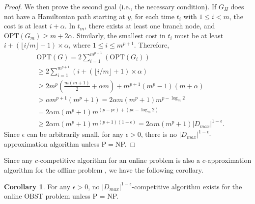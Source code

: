 \documentclass[10pt, conference, letterpaper]{IEEEtran}
\theoremstyle{definition}
\newtheorem{defi}{Definition}
\newtheorem{coro}{Corollary}
\begin{document}
\begin{proof}
We then prove the second goal (i.e., the necessary condition). If $G_{H}$ does not have a Hamiltonian path starting at $y$, for each time $t_i$ with $1\leq i < m$, the cost is at least $i+\alpha$. In $t_m$, there exists at least one branch node, and $\mathrm{OPT}(G_{m}) \geq m+2\alpha$. Similarly, the smallest cost in $t_i$ must be at least $i+(\lfloor i/m \rfloor+1) \times \alpha$, where $1\leq i\leq m^{p+1}$. Therefore,
\begin{align*}
&\mathrm{OPT}(G)  = 2\sum_{i=1}^{m^{p+1}}(\mathrm{OPT}(G_{i}))\\
                &\geq 2\sum_{i=1}^{m^{p+1}}(i+(\lfloor i/m \rfloor+1) \times \alpha)\\%
            & \geq  2m^{p}(\frac{m(m+1)}{2}+\alpha m)+m^{p+1}(m^{p}-1)(m+\alpha)\\
            & > \alpha m^{p+1}(m^{p}+1)=2\alpha m(m^{p}+1)m^{p-\log _{m}2} \\
            & = 2\alpha m( m^{p}+1) m^{(p-p\epsilon)+(p\epsilon -\log_{m}2)} \\
            & \geq  2\alpha m(m^{p}+1) m^{(p+1)(1-\epsilon)}=2\alpha m(m^{p}+1)|D_{max}|^{1-\epsilon}.
\end{align*}
Since $\epsilon $ can be arbitrarily small, for any $\epsilon >0$, there is no $%
|D_{max}|^{1-\epsilon }$-approximation algorithm unless P$=$NP.
\end{proof}

Since any $c$-competitive algorithm for an online problem is also a $c$-approximation algorithm for the offline problem \cite{OnlineCompetitiveAnalsis}, we have the following corollary.
\begin{coro}
For any $\epsilon>0$, no $|D_{max}|^{1-\epsilon}$-competitive algorithm exists for the online OBST problem unless P = NP.
\end{coro}

\end{document}
